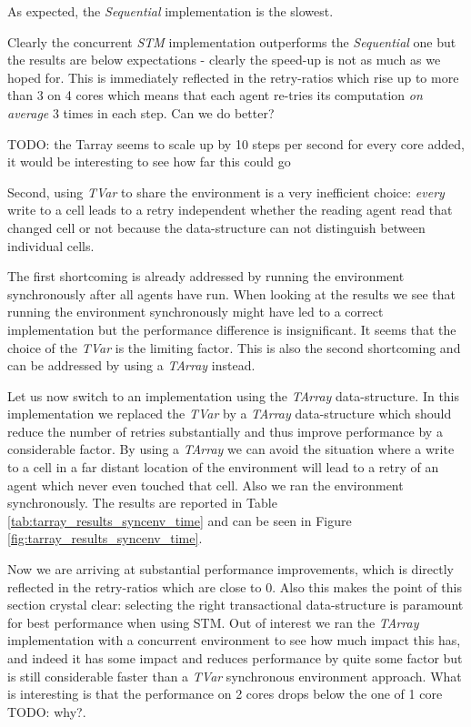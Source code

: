 As expected, the \textit{Sequential} implementation is the slowest. 

Clearly the concurrent \textit{STM} implementation outperforms the \textit{Sequential} one but the results are below expectations - clearly the speed-up is not as much as we hoped for. This is immediately reflected in the retry-ratios which rise up to more than 3 on 4 cores which means that each agent re-tries its computation \textit{on average} 3 times in each step. Can we do better?


TODO: the Tarray seems to scale up by 10 steps per second for every core added, it would be interesting to see how far this could go


Second, using \textit{TVar} to share the environment is a very inefficient choice: \textit{every} write to a cell leads to a retry independent whether the reading agent read that changed cell or not because the data-structure can not distinguish between individual cells.

The first shortcoming is already addressed by running the environment synchronously after all agents have run. When looking at the results we see that running the environment synchronously might have led to a correct implementation but the performance difference is insignificant. It seems that the choice of the \textit{TVar} is the limiting factor. This is also the second shortcoming and can be addressed by using a \textit{TArray} instead. 

Let us now switch to an implementation using the \textit{TArray} data-structure. In this implementation we replaced the \textit{TVar} by a \textit{TArray} data-structure which should reduce the number of retries substantially and thus improve performance by a considerable factor. By using a \textit{TArray} we can avoid the situation where a write to a cell in a far distant location of the environment will lead to a retry of an agent which never even touched that cell. Also we ran the environment synchronously. The results are reported in Table \ref{tab:tarray_results_syncenv_time} and can be seen in Figure \ref{fig:tarray_results_syncenv_time}.

Now we are arriving at substantial performance improvements, which is directly reflected in the retry-ratios which are close to 0. Also this makes the point of this section crystal clear: selecting the right transactional data-structure is paramount for best performance when using STM. Out of interest we ran the \textit{TArray} implementation with a concurrent environment to see how much impact this has, and indeed it has some impact and reduces performance by quite some factor but is still considerable faster than a \textit{TVar} synchronous environment approach. What is interesting is that the performance on 2 cores drops below the one of 1 core TODO: why?.

